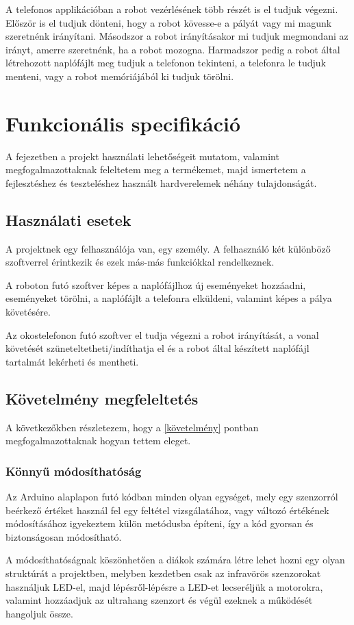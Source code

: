 \documentclass[]{thesis-ekf}
\theoremstyle{definition}
\begin{document}
A telefonos applikációban a robot vezérlésének több részét is el tudjuk végezni. Először is el tudjuk dönteni, hogy a robot kövesse-e a pályát vagy mi magunk szeretnénk irányítani. Másodszor a robot irányításakor mi tudjuk megmondani az irányt, amerre szeretnénk, ha a robot mozogna. Harmadszor pedig a robot által létrehozott naplófájlt meg tudjuk a telefonon tekinteni, a telefonra le tudjuk menteni, vagy a robot memóriájából ki tudjuk törölni.
\chapter{Funkcionális specifikáció}\label{fejezet_3}
A fejezetben a projekt használati lehetőségeit mutatom, valamint  megfogalmazottaknak feleltetem meg a termékemet, majd ismertetem a fejlesztéshez és teszteléshez használt hardverelemek néhány tulajdonságát.
\section{Használati esetek}
A projektnek egy felhasználója van, egy személy. A felhasználó két különböző szoftverrel érintkezik és ezek más-más funkciókkal rendelkeznek.

A roboton futó szoftver képes a naplófájlhoz új eseményeket hozzáadni, eseményeket törölni, a naplófájlt a telefonra elküldeni, valamint képes a pálya követésére.

Az okostelefonon futó szoftver el tudja végezni a robot irányítását, a vonal követését szüneteltetheti/indíthatja el és a robot által készített naplófájl tartalmát lekérheti és mentheti.
\section{Követelmény megfeleltetés}
A következőkben részletezem, hogy a \ref{követelmény} pontban megfogalmazottaknak hogyan tettem eleget.
\subsection{Könnyű módosíthatóság}
Az Arduino alaplapon futó kódban minden olyan egységet, mely egy szenzorról beérkező értéket használ fel egy feltétel vizsgálatához, vagy változó értékének módosításához igyekeztem külön metódusba építeni, így a kód gyorsan és biztonságosan módosítható.

A módosíthatóságnak köszönhetően a diákok számára létre lehet hozni egy olyan struktúrát a projektben, melyben kezdetben csak az infravörös szenzorokat használjuk LED-el, majd lépésről-lépésre a LED-et lecseréljük a motorokra, valamint hozzáadjuk az ultrahang szenzort és végül ezeknek a működését hangoljuk össze.
\end{document}

